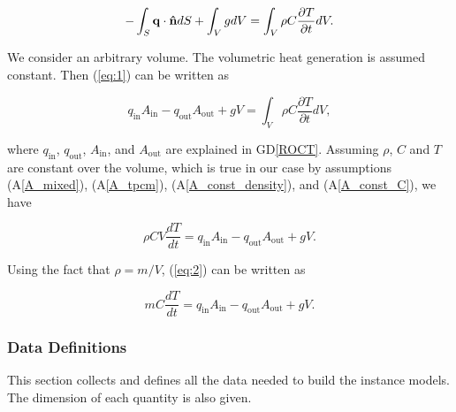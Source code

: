 \documentclass[12pt]{article}
\newcommand{\dref}[1]{GD\ref{#1}}
\newcommand{\aref}[1]{A\ref{#1}}
\begin{document}
\begin{equation}
-\int_S{ \bf{q\cdot \hat n}} dS+\int_V g dV= \int_V \rho C \frac{\partial T}{\partial t}dV. \label{eq:1}
\end{equation}

\noindent
We consider an arbitrary volume.  The volumetric heat generation is assumed
constant.  Then (\ref{eq:1}) can be written as


\begin{equation*}
  q_{\mathrm{in}} A_{\mathrm{in}} - q_{\mathrm{out}} A_{\mathrm{out}} + g V = \int_V \rho C \frac{\partial T}{\partial t}dV,
\end{equation*}

\noindent where $q_{\mathrm{in}}$, $q_{\mathrm{out}}$, $A_{\mathrm{in}}$, and 
$A_{\mathrm{out}}$ are explained in \dref{ROCT}.  Assuming $\rho$, $C$ and $T$ are
constant over the volume, which is true in our case by assumptions (\aref{A_mixed}),
(\aref{A_tpcm}), (\aref{A_const_density}), and (\aref{A_const_C}), we have

\begin{equation}
\rho C V\frac{dT}{dt} = q_{\mathrm{in}} A_{\mathrm{in}} - q_{\mathrm{out}} A_{\mathrm{out}} + g V. \label{eq:2}
\end{equation}

\noindent
Using the fact that $\rho = {m}/{V}$, (\ref{eq:2}) can be written as

\begin{equation*}
m C \frac{dT}{dt} = q_{\mathrm{in}} A_{\mathrm{in}} - q_{\mathrm{out}} A_{\mathrm{out}} + g V.
\end{equation*}

\subsubsection{Data Definitions}\label{sec_datadef}

This section collects and defines all the data needed to build the instance
models. The dimension of each quantity is also given.

~\newline
\end{document}
